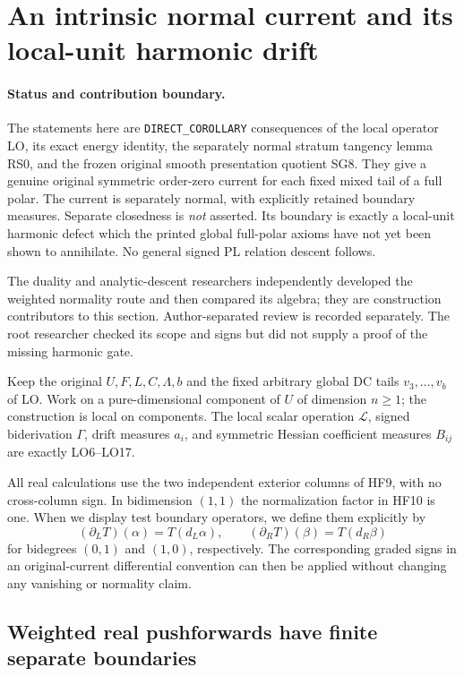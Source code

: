 \section{An intrinsic normal current and its local-unit harmonic drift}
\label{sec:r18-intrinsic-normal-current}

\paragraph{Status and contribution boundary.}
The statements here are \texttt{DIRECT\_COROLLARY} consequences of the
local operator LO, its exact energy identity, the separately normal
stratum tangency lemma RS0, and the frozen original smooth presentation
quotient SG8.  They give a genuine original symmetric order-zero current
for each fixed mixed tail of a full polar.  The current is separately
normal, with explicitly retained boundary measures.  Separate closedness
is \emph{not} asserted.  Its boundary is exactly a local-unit harmonic
defect which the printed global full-polar axioms have not yet been
shown to annihilate.  No general signed PL relation descent follows.

The duality and analytic-descent researchers independently developed
the weighted normality route and then compared its algebra; they are
construction contributors to this section.  Author-separated review is
recorded separately.  The root researcher checked its scope and signs
but did not supply a proof of the missing harmonic gate.

Keep the original \(U,F,L,C,\Lambda,b\) and the fixed arbitrary global
DC tails \(v_3,\ldots,v_b\) of LO.  Work on a pure-dimensional
component of \(U\) of dimension \(n\ge1\); the construction is local
on components.  The local scalar operation \(\mathscr L\), signed
biderivation \(\Gamma\), drift measures \(a_i\), and symmetric
Hessian coefficient measures \(B_{ij}\) are exactly LO6--LO17.

All real calculations use the two independent exterior columns of
HF9, with no cross-column sign.  In bidimension \((1,1)\) the
normalization factor in HF10 is one.  When we display test boundary
operators, we define them explicitly by
\[
       (\partial_LT)(\alpha)=T(d_L\alpha),\qquad
       (\partial_RT)(\beta)=T(d_R\beta)
 \tag{NC1}
\]
for bidegrees \((0,1)\) and \((1,0)\), respectively.  The
corresponding graded signs in an original-current differential convention
can then be applied without changing any vanishing or normality claim.

\subsection{Weighted real pushforwards have finite separate boundaries}

